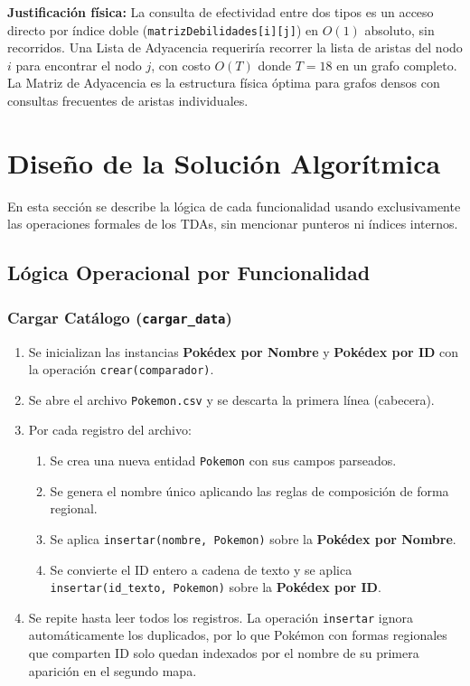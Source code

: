 \documentclass[12pt, letterpaper]{article}
\begin{document}
\textbf{Justificación física:} La consulta de efectividad entre dos tipos es un acceso directo por índice doble (\texttt{matrizDebilidades[i][j]}) en $O(1)$ absoluto, sin recorridos. Una Lista de Adyacencia requeriría recorrer la lista de aristas del nodo $i$ para encontrar el nodo $j$, con costo $O(T)$ donde $T=18$ en un grafo completo. La Matriz de Adyacencia es la estructura física óptima para grafos densos con consultas frecuentes de aristas individuales.

\section{Diseño de la Solución Algorítmica}

En esta sección se describe la lógica de cada funcionalidad usando exclusivamente las operaciones formales de los TDAs, sin mencionar punteros ni índices internos.

\subsection{Lógica Operacional por Funcionalidad}

\subsubsection{Cargar Catálogo (\texttt{cargar\_data})}

\begin{enumerate}
    \item Se inicializan las instancias \textbf{Pokédex por Nombre} y \textbf{Pokédex por ID} con la operación \texttt{crear(comparador)}.
    \item Se abre el archivo \texttt{Pokemon.csv} y se descarta la primera línea (cabecera).
    \item Por cada registro del archivo:
    \begin{enumerate}
        \item Se crea una nueva entidad \texttt{Pokemon} con sus campos parseados.
        \item Se genera el nombre único aplicando las reglas de composición de forma regional.
        \item Se aplica \texttt{insertar(nombre, Pokemon)} sobre la \textbf{Pokédex por Nombre}.
        \item Se convierte el ID entero a cadena de texto y se aplica \texttt{insertar(id\_texto, Pokemon)} sobre la \textbf{Pokédex por ID}.
    \end{enumerate}
    \item Se repite hasta leer todos los registros. La operación \texttt{insertar} ignora automáticamente los duplicados, por lo que Pokémon con formas regionales que comparten ID solo quedan indexados por el nombre de su primera aparición en el segundo mapa.
\end{enumerate}
\end{document}
